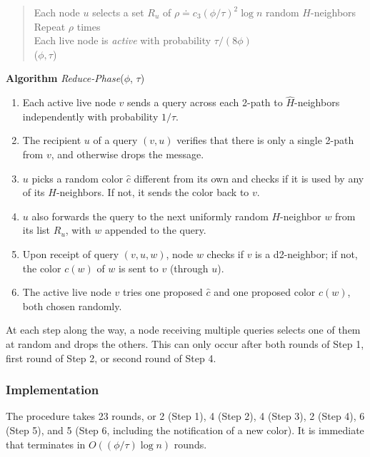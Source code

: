 \begin{quote}
   Each node $u$ selects a set $R_u$ of $\rho \doteq c_3 (\phi/\tau)^2 \log n$ random $H$-neighbors \\
    Repeat $\rho$ times \\
    \hspace*{2em} Each live node is \emph{active} with probability $\tau/(8\phi)$ \\
    \hspace*{2em} ($\phi,\tau$) %
\end{quote}
    
   \textbf{Algorithm} \emph{Reduce-Phase}($\phi$, $\tau$)
\begin{enumerate}
\itemsep 0em 
  \item Each active live node $v$ sends a query across each 2-path to $\hat{H}$-neighbors independently with probability $1/\tau$.
  \item The recipient $u$ of a query $(v,u)$ verifies that there is only a single 2-path from $v$, and otherwise drops the message.
  \item $u$ picks a random color $\hat{c}$ different from its own and checks if it is used by any of its $H$-neighbors. If not, it sends the color back to $v$.
  \item $u$ also forwards the query to the next uniformly random $H$-neighbor $w$ from its list $R_u$, with $w$ appended to the query. %
  \item Upon receipt of query $(v,u,w)$, node $w$ checks if $v$ is a d2-neighbor; if not, the color $c(w)$ of $w$ is sent to $v$ (through $u$).
  \item The active live node $v$ tries one proposed $\hat{c}$ and one proposed color $c(w)$, both chosen randomly.
  \end{enumerate}
At each step along the way, a node receiving multiple queries selects one of them at random and drops the others. This can only occur after both rounds of Step 1, first round of Step 2, or second round of Step 4.

\subsubsection{Implementation}
The procedure  takes 23 rounds, or 2 (Step 1), 4 (Step 2), 4 (Step 3), 2 (Step 4), 6 (Step 5), and 5 (Step 6, including the notification of a new color). It is immediate that  terminates in $O((\phi/\tau) \log n)$ rounds.




